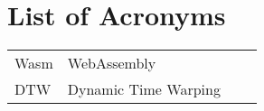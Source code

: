 \chapter{List of Acronyms}

\begin{table}[h]
\begin{tabular}{p{2.7cm}lp{8cm}l}

Wasm             & WebAssembly\\
DTW               & Dynamic Time Warping \\ 	

\end{tabular}
\end{table}